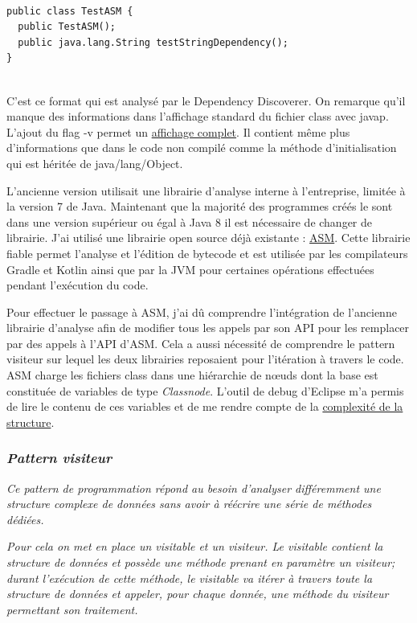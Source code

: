 \documentclass[french,a4paper,12pt]{report}
\begin{document}
\begin{lstlisting}

public class TestASM {
  public TestASM();
  public java.lang.String testStringDependency();
}


\end{lstlisting}

C'est ce format qui est analysé par le Dependency Discoverer. On remarque qu'il manque des informations dans l'affichage standard du fichier class avec javap. L'ajout du flag -v permet un \hyperref[javapVtestASM]{affichage complet}. Il contient même plus d'informations que dans le code non compilé comme la méthode d'initialisation qui est héritée de java/lang/Object.

\bigskip

L'ancienne version utilisait une librairie d'analyse interne à l'entreprise, limitée à la version 7 de Java. Maintenant que la majorité des programmes créés le sont dans une version supérieur ou égal à Java 8 il est nécessaire de changer de librairie. J'ai utilisé une librairie open source déjà existante : \href{https://asm.ow2.io/}{ASM}. Cette librairie fiable permet l'analyse et l'édition de bytecode et est utilisée par les compilateurs Gradle et Kotlin ainsi que par la JVM pour certaines opérations effectuées pendant l’exécution du code.

Pour effectuer le passage à ASM, j'ai dû comprendre l'intégration de l'ancienne librairie d'analyse afin de modifier tous les appels par son API pour les remplacer par des appels à l'API d'ASM. Cela a aussi nécessité de comprendre le pattern visiteur sur lequel les deux librairies reposaient pour l'itération à travers le code. ASM charge les fichiers class dans une hiérarchie de nœuds dont la base est constituée de variables de type \textit{Classnode}. L'outil de debug d'Eclipse m'a permis de lire le contenu de ces variables et de me rendre compte de la \hyperref[ClassNode]{complexité de la structure}.

\bigskip

\subsubsection{\textit{Pattern visiteur}} 

\textit{Ce pattern de programmation répond au besoin d'analyser différemment une structure complexe de données sans avoir à réécrire une série de méthodes dédiées.}

\textit{Pour cela on met en place un visitable et un visiteur. Le visitable contient la structure de données et possède une méthode prenant en paramètre un visiteur; durant l’exécution de cette méthode, le visitable va itérer à travers toute la structure de données et appeler, pour chaque donnée, une méthode du visiteur permettant son traitement.}
\end{document}
